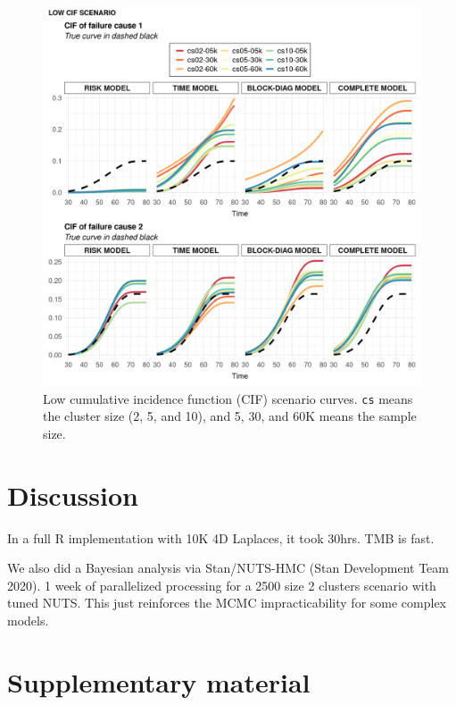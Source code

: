 \documentclass[a4paper,12pt]{article}
\begin{document}
\begin{figure}[H]
 \centering
 \includegraphics[width=\linewidth]{../../THESIS/thesis/figures/cifs-2.png}
 \vspace{-0.75cm}
 \caption{Low cumulative incidence function (CIF) scenario
   curves. \texttt{cs} means the cluster size (2, 5, and 10), and 5, 30,
   and 60K means the sample size.}
 \label{fig:cifslow}
\end{figure}

\section{Discussion}
\label{discussion}

In a full R implementation with 10K 4D Laplaces, it took 30hrs. TMB is
fast.

We also did a Bayesian analysis via Stan/NUTS-HMC (Stan Development Team
2020). 1 week of parallelized processing for a 2500 size 2 clusters
scenario with tuned NUTS. This just reinforces the MCMC impracticability
for some complex models.

\section*{Supplementary material}
\end{document}
